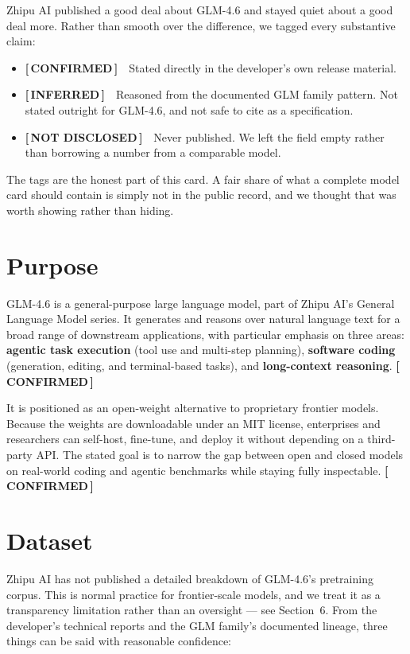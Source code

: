 \documentclass[11pt,a4paper]{article}
\newcommand{\tg}[2]{{\scriptsize\sffamily\bfseries\color{#1}[\,#2\,]}}
\newcommand{\Conf}{\tg{moss}{CONFIRMED}}
\newcommand{\Infr}{\tg{clay}{INFERRED}}
\newcommand{\Undi}{\tg{stone}{NOT DISCLOSED}}
\begin{document}
Zhipu AI published a good deal about GLM-4.6 and stayed quiet about a good deal more. Rather
than smooth over the difference, we tagged every substantive claim:

\begin{itemize}[itemsep=4pt]
  \item \Conf\ \ Stated directly in the developer's own release material.
  \item \Infr\ \ Reasoned from the documented GLM family pattern. Not stated outright for
        GLM-4.6, and not safe to cite as a specification.
  \item \Undi\ \ Never published. We left the field empty rather than borrowing a number from a
        comparable model.
\end{itemize}

The tags are the honest part of this card. A fair share of what a complete model card should
contain is simply not in the public record, and we thought that was worth showing rather than
hiding.

\section{Purpose}

GLM-4.6 is a general-purpose large language model, part of Zhipu AI's General Language Model
series. It generates and reasons over natural language text for a broad range of downstream
applications, with particular emphasis on three areas: \textbf{agentic task execution} (tool use
and multi-step planning), \textbf{software coding} (generation, editing, and terminal-based
tasks), and \textbf{long-context reasoning}. \Conf

It is positioned as an open-weight alternative to proprietary frontier models. Because the
weights are downloadable under an MIT license, enterprises and researchers can self-host,
fine-tune, and deploy it without depending on a third-party API. The stated goal is to narrow
the gap between open and closed models on real-world coding and agentic benchmarks while staying
fully inspectable. \Conf

\section{Dataset}

Zhipu AI has not published a detailed breakdown of GLM-4.6's pretraining corpus. This is normal
practice for frontier-scale models, and we treat it as a transparency limitation rather than an
oversight --- see Section~6. From the developer's technical reports and the GLM family's
documented lineage, three things can be said with reasonable confidence:
\end{document}
